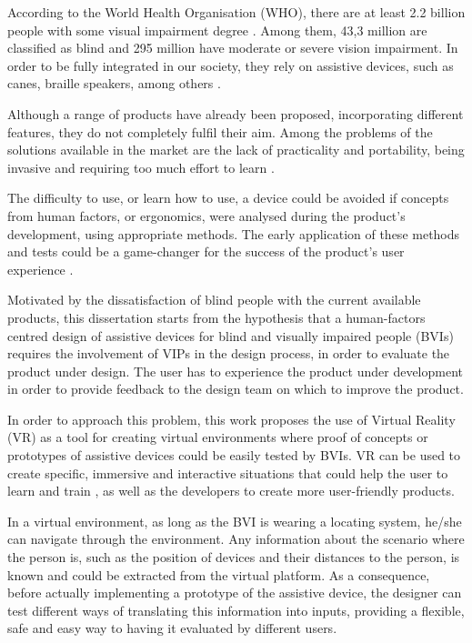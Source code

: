 

According to the World Health Organisation (WHO), there are at least 2.2 billion people with some visual impairment degree \cite{world2019world}. Among them, 43,3 million are classified as blind and 295 million have moderate or severe vision impairment. In order to be fully integrated in our society, they rely on assistive devices, such as canes, braille speakers, among others \cite{bourne2021trends}. 

Although a range of products have already been proposed, incorporating different features, they do not completely fulfil their aim. Among the problems of the solutions available in the market are the lack of practicality and portability, being invasive and requiring too much effort to learn \cite{lozano2009electrotactile}.

The difficulty to use, or learn how to use, a device could be avoided if concepts from human factors, or ergonomics, were analysed during the product’s development, using appropriate methods. The early application of these methods and tests could be a game-changer for the success of the product's user experience \cite{wolf2019towards}.

Motivated by the dissatisfaction of blind people with the current available products, this dissertation starts from the hypothesis that a human-factors centred design of assistive devices for blind and visually impaired people (BVIs) requires the involvement of VIPs in the design process, in order to evaluate the product under design. The user has to experience the product under development in order to provide feedback to the design team on which to improve the product.

In order to approach this problem, this work proposes the use of Virtual Reality (VR) as a tool for creating virtual environments where proof of concepts or prototypes of assistive devices could be easily tested by BVIs. VR can be used to create specific, immersive and interactive situations that could help the user to learn and train \cite{farrell2018learning}, as well as the developers to create more user-friendly products. 

In a virtual environment, as long as the BVI is wearing a locating system, he/she can navigate through the environment. Any information about the scenario where the person is, such as the position of devices and their distances to the person, is known and could be extracted from the virtual platform. As a consequence, before actually implementing a prototype of the assistive device, the designer can test different ways of translating this information into inputs, providing a flexible, safe and easy way to having it evaluated by different users.

